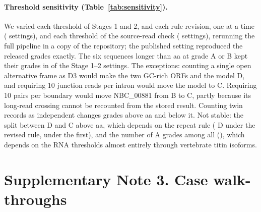 \documentclass[11pt]{article}
\begin{document}
\paragraph{Threshold sensitivity (Table~\ref{tab:sensitivity}).} We varied each threshold of Stages 1 and 2, and each rule
revision, one at a time ( settings), and each threshold of the source-read check (
settings), rerunning the full pipeline in a copy of the repository; the published setting reproduced the released grades
exactly. The six sequences longer than  aa at grade A or B kept their grades in  of the
 Stage 1--2 settings. The exceptions: counting a single open alternative frame as D3 would make the two
GC-rich  ORFs and the  model D, and requiring 10 junction reads per intron would move the
 model to C. Requiring 10 pairs per boundary would move NBC\_00881 from B to C, partly because its long-read
crossing cannot be recounted from the stored result. Counting twin records as independent changes  grades above
 aa and  below it. Not stable: the split between D and C above  aa, which depends
on the repeat rule ( D under the revised rule,  under the first), and the number of A
grades among all  (), which depends on the RNA thresholds almost entirely through
vertebrate titin isoforms.

\begin{table}[ht]
\centering\scriptsize
\caption{Threshold sensitivity. Each threshold varied alone; ranges include the published value. Counts are sequences
(all ; the  longer than  aa). Last column: most sequences changing grade
(of which above  aa).}\label{tab:sensitivity}
\setlength{\tabcolsep}{3pt}
\end{table}

\FloatBarrier
\section*{Supplementary Note 3. Case walk-throughs}
\end{document}

